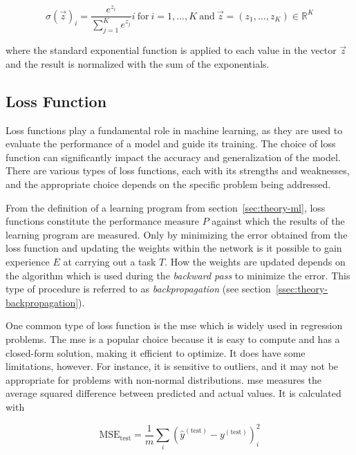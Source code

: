 \documentclass[draft,final]{vutinfth} %
\begin{document}
\begin{equation}
  \label{eq:softmax}
  \sigma(\vec{z})_{i} = \frac{e^{z_i}}{\sum_{j=1}^Ke^{z_j}}i\ \mathrm{for}\ i = 1,\dots,K\ \mathrm{and}\ \vec{z} = (z_1,\dots,z_K)\in\mathbb{R}^K
\end{equation}

where the standard exponential function is applied to each value in
the vector $\vec{z}$ and the result is normalized with the sum of the
exponentials.

\subsection{Loss Function}
\label{ssec:theory-loss-function}

Loss functions play a fundamental role in machine learning, as they
are used to evaluate the performance of a model and guide its
training. The choice of loss function can significantly impact the
accuracy and generalization of the model. There are various types of
loss functions, each with its strengths and weaknesses, and the
appropriate choice depends on the specific problem being addressed.

From the definition of a learning program from
section~\ref{sec:theory-ml}, loss functions constitute the performance
measure $P$ against which the results of the learning program are
measured. Only by minimizing the error obtained from the loss function
and updating the weights within the network is it possible to gain
experience $E$ at carrying out a task $T$. How the weights are updated
depends on the algorithm which is used during the \emph{backward pass}
to minimize the error. This type of procedure is referred to as
\emph{backpropagation} (see
section~\ref{ssec:theory-backpropagation}).

One common type of loss function is the \gls{mse} which is widely used
in regression problems. The \gls{mse} is a popular choice because it
is easy to compute and has a closed-form solution, making it efficient
to optimize. It does have some limitations, however. For instance, it
is sensitive to outliers, and it may not be appropriate for problems
with non-normal distributions. \gls{mse} measures the average squared
difference between predicted and actual values. It is calculated with

\begin{equation}
  \label{eq:mse}
  \mathrm{MSE_{test}} = \frac{1}{m}\sum_i(\hat{y}^{(\mathrm{test})} - y^{(\mathrm{test})})_i^2
\end{equation}
\end{document}
